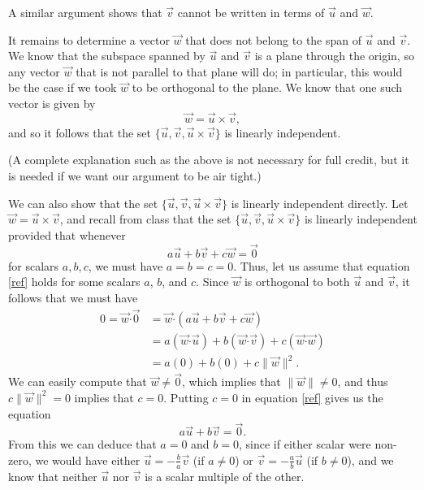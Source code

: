 \documentclass[letterpaper,12pt]{amsart}
\newcommand{\len}[1]{\lVert #1\rVert}
\newcommand{\dotp}{\boldsymbol{\cdot}}
\begin{document}
\begin{enumerate}
\begin{enumerate}
A similar argument shows that $\vec{v}$ cannot be written in terms of $\vec{u}$ and $\vec{w}$.

It remains to determine a vector $\vec{w}$ that does not belong to the span of $\vec{u}$ and $\vec{v}$. We know that the subspace spanned by $\vec{u}$ and $\vec{v}$ is a plane through the origin, so any vector $\vec{w}$ that is not parallel to that plane will do; in particular, this would be the case if we took $\vec{w}$ to be orthogonal to the plane. We know that one such vector is given by
\[
 \vec{w} = \vec{u}\times \vec{v},
\]
and so it follows that the set $\{\vec{u},\vec{v}, \vec{u}\times\vec{v}\}$ is linearly independent.

(A complete explanation such as the above is not necessary for full credit, but it is needed if we want our argument to be air tight.)

\bigskip

We can also show that the set $\{\vec{u},\vec{v}, \vec{u}\times\vec{v}\}$ is linearly independent directly. Let $\vec{w}=\vec{u}\times\vec{v}$, and recall from class that the set $\{\vec{u},\vec{v}, \vec{u}\times\vec{v}\}$ is linearly independent provided that whenever
\begin{equation}\label{ref}
 a\vec{u}+b\vec{v}+c\vec{w} = \vec{0}
\end{equation}
for scalars $a,b,c$, we must have $a=b=c=0$. Thus, let us assume that equation \eqref{ref} holds for some scalars $a$, $b$, and $c$. Since $\vec{w}$ is orthogonal to both $\vec{u}$ and $\vec{v}$, it follows that we must have
\begin{align*}
 0 = \vec{w}\dotp \vec{0} & = \vec{w}\dotp(a\vec{u}+b\vec{v}+c\vec{w})\\
 & = a(\vec{w}\dotp\vec{u})+b(\vec{w}\dotp\vec{v})+c(\vec{w}\dotp\vec{w})\\
 & = a(0)+b(0)+c\len{\vec{w}}^2.
\end{align*}
We can easily compute that $\vec{w}\neq\vec{0}$, which implies that $\len{\vec{w}}\neq 0$, and thus $c\len{\vec{w}}^2=0$ implies that $c=0$. Putting $c=0$ in equation \eqref{ref} gives us the equation
\[
 a\vec{u}+b\vec{v}=\vec{0}.
\]
From this we can deduce that $a=0$ and $b=0$, since if either scalar were non-zero, we would have either $\vec{u} = -\frac{b}{a}\vec{v}$ (if $a\neq 0$) or $\vec{v} = -\frac{a}{b}\vec{u}$ (if $b\neq 0$), and we know that neither $\vec{u}$ nor $\vec{v}$ is a scalar multiple of the other.
\end{enumerate}

\bigskip


\end{enumerate}
\end{document}
